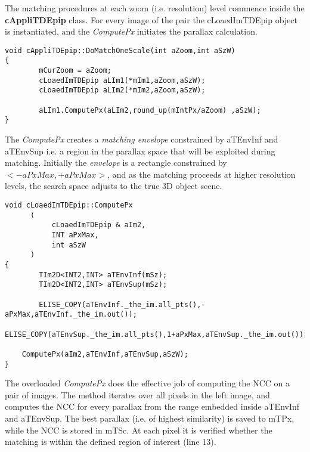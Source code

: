 The matching procedures at each zoom (i.e. resolution) level commence inside the \textbf{cAppliTDEpip} class. For every image of the pair the cLoaedImTDEpip object is instantiated, and the \emph{ComputePx} initiates the parallax calculation.

\begin{lstlisting}
void cAppliTDEpip::DoMatchOneScale(int aZoom,int aSzW)
{
        mCurZoom = aZoom;
        cLoaedImTDEpip aLIm1(*mIm1,aZoom,aSzW);
        cLoaedImTDEpip aLIm2(*mIm2,aZoom,aSzW);

        aLIm1.ComputePx(aLIm2,round_up(mIntPx/aZoom) ,aSzW);
}
\end{lstlisting}

The \emph{ComputePx} creates a \emph{matching envelope} constrained by aTEnvInf and aTEnvSup i.e. a region in the parallax space that will be exploited during matching. Initially the \emph{envelope} is a rectangle constrained by $<-aPxMax,+aPxMax>$, and as the matching proceeds at higher resolution levels, the search space adjusts to the true 3D object scene.

\begin{lstlisting}
void cLoaedImTDEpip::ComputePx
      (
           cLoaedImTDEpip & aIm2,
           INT aPxMax,
           int aSzW
      )
{
        TIm2D<INT2,INT> aTEnvInf(mSz);
        TIm2D<INT2,INT> aTEnvSup(mSz);

        ELISE_COPY(aTEnvInf._the_im.all_pts(),-aPxMax,aTEnvInf._the_im.out());
        ELISE_COPY(aTEnvSup._the_im.all_pts(),1+aPxMax,aTEnvSup._the_im.out());

    ComputePx(aIm2,aTEnvInf,aTEnvSup,aSzW);
}
\end{lstlisting}

The overloaded \emph{ComputePx} does the effective job of computing the NCC on a pair of images. The method iterates over all pixels in the left image, and computes the NCC for every parallax from the range embedded inside aTEnvInf and aTEnvSup. The best parallax (i.e. of highest similarity) is saved to mTPx, while the NCC is stored in mTSc. At each pixel it is verified whether the matching is within the defined region of interest (line 13).

